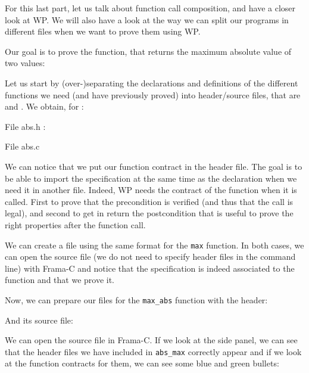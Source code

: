 For this last part, let us talk about function call composition,
and have a closer look at WP. We will also have a look at the way we can split
our programs in different files when we want to prove them using WP.

Our goal is to prove the  function, that returns
the maximum absolute value of two values:






Let us start by (over-)separating the declarations and definitions of the
different functions we need (and have previously proved) into header/source
files, that are  and . We obtain, for
:



File abs.h :




File abs.c




We can notice that we put our function contract in the header file.
The goal is to be able to import the specification at the same time as
the declaration when we need it in another file. Indeed, WP needs the
contract of the function when it is called. First to prove that the
precondition is verified (and thus that the call is legal), and second
to get in return the postcondition that is useful to prove the right
properties after the function call.

We can create a file using the same format for the \texttt{max}
function. In both cases, we can open the source file (we do not need to
specify header files in the command line) with Frama-C and notice that
the specification is indeed associated to the function and that we prove
it.


Now, we can prepare our files for the \texttt{max\_abs} function with
the header:






And its source file:






We can open the source file in Frama-C. If we look at the side panel, we
can see that the header files we have included in \texttt{abs\_max}
correctly appear and if we look at the function contracts for them, we
can see some blue and green bullets:



